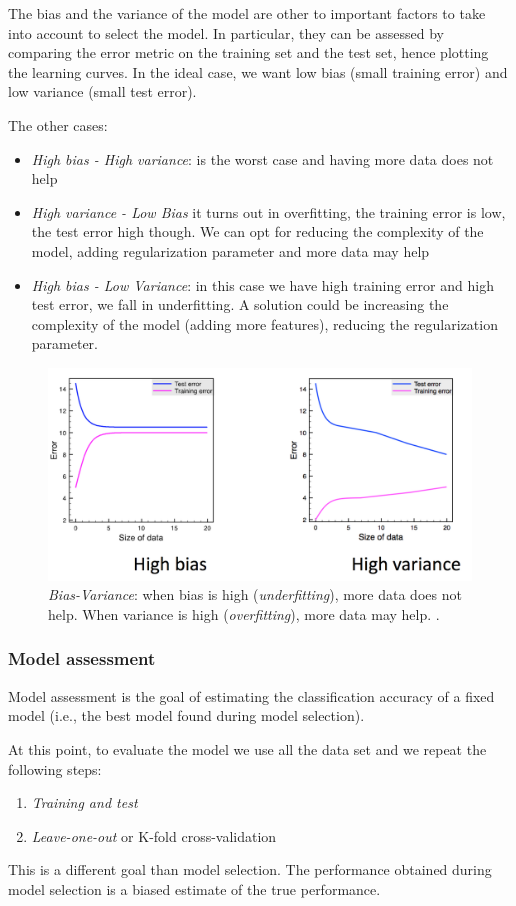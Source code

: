 The bias and the variance of the model are other to important factors to take into account to select the model. In particular, they can be assessed by comparing the error metric on the training set and the test set, hence plotting the learning curves. In the ideal case, we want low bias (small training error) and low variance (small test error).

The other cases:
\begin{itemize}
\item \emph{High bias - High variance}: is the worst case and having more data does not help

\item \emph{High variance - Low Bias} it turns out in overfitting, the training error is low, the test error high though. We can opt for reducing the complexity of the model, adding regularization parameter and more data may help

\item \emph{High bias - Low Variance}: in this case we have high training error and high test error, we fall in underfitting. A solution could be increasing the complexity of the model (adding more features), reducing the regularization parameter.
\end{itemize}

\begin{figure}[H]%
 \centering
 \includegraphics[width=13cm]{./img/08/bias_variance}
 \caption{\label{pic:bias_variance} \emph{Bias-Variance}: when bias is high (\emph{underfitting}), more data does not help. When variance is high (\emph{overfitting}), more data may help.
.}
\end{figure}

\subsubsection{Model assessment}

Model assessment is the goal of estimating the classification accuracy of a fixed model (i.e., the best model found during model selection).

At this point, to evaluate the model we use all the data set and we repeat the following steps:
\begin{enumerate}
\item \emph{Training and test}
\item \emph{Leave-one-out} or {K-fold cross-validation}
\end{enumerate}

This is a different goal than model selection. The performance obtained during model selection is a biased estimate of the true performance.